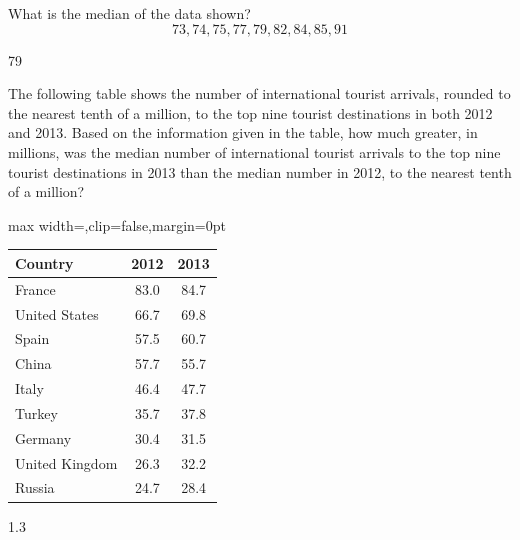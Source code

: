 \newpage


\question[1]
What is the median of the data shown?\\
$$73,74,75,77,79,82,84,85,91$$
\begin{solution}
79
\end{solution}

\question[1]
The following table shows the number of international tourist arrivals, rounded to the nearest tenth of a million, to the top nine tourist destinations in both 2012 and 2013. Based on the information given in the table, how much greater, in millions, was the median number of international tourist arrivals to the top nine tourist destinations in 2013 than the median number in 2012, to the nearest tenth of a million?
\begin{center}
  \renewcommand{\arraystretch}{1.3}
  \setlength{\tabcolsep}{0.5em}
  \label{tab:sat-drill-07-tourist-arrivals}%
  \vspace{0.35em}
  \begin{adjustbox}{max width=\linewidth,clip=false,margin=0pt}
  \begin{tabular}{|l|c|c|}
    \hline
    \cellcolor[HTML]{E0E0E0}\textbf{Country} &
    \cellcolor[HTML]{E0E0E0}\textbf{2012} &
    \cellcolor[HTML]{E0E0E0}\textbf{2013} \\
    \hline
    France & 83.0 & 84.7 \\
    \hline
    United States & 66.7 & 69.8 \\
    \hline
    Spain & 57.5 & 60.7 \\
    \hline
    China & 57.7 & 55.7 \\
    \hline
    Italy & 46.4 & 47.7 \\
    \hline
    Turkey & 35.7 & 37.8 \\
    \hline
    Germany & 30.4 & 31.5 \\
    \hline
    United Kingdom & 26.3 & 32.2 \\
    \hline
    Russia & 24.7 & 28.4 \\
    \hline
  \end{tabular}
  \end{adjustbox}
\end{center}
\begin{solution}
1.3
\end{solution}


\newpage


